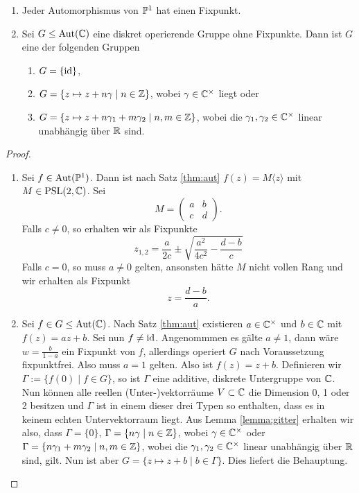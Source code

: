 \begin{lemma}
  \label{lemma:deck-pc}
  \begin{enumerate}
  \item Jeder Automorphismus von $\P^1$ hat einen Fixpunkt.
  \item Sei $G \leq \Aut(\C)$ eine diskret operierende Gruppe ohne
    Fixpunkte. Dann ist $G$ eine der folgenden Gruppen
    \begin{enumerate}
    \item $G = \{\id\}$,
    \item $G = \{ z \mapsto z + n \gamma \mid n \in \Z\}$, wobei $\gamma
      \in \C^\times$ liegt oder
    \item $G = \{z \mapsto z + n \gamma_1 + m \gamma_2 \mid n,m \in
      \Z\}$, wobei die $\gamma_1, \gamma_2 \in \C^\times$ linear
      unabhängig über $\R$ sind.
    \end{enumerate}
  \end{enumerate}
\end{lemma}

\begin{proof}
  \begin{enumerate}
  \item Sei $f \in \Aut(\P^1)$. Dann ist nach Satz \ref{thm:aut} $f(z) = M\langle z \rangle$ mit $M
    \in \PSL(2, \C)$. Sei
    \[
    M =
    \begin{pmatrix}
      a & b \\
      c & d
    \end{pmatrix}.
    \]
    Falls $c \neq 0$, so erhalten wir als Fixpunkte
    \[
    z_{1,2} = \frac{a}{2c} \pm \sqrt{\frac{a^2}{4 c^2} - \frac{d-b}{c}}
    \]
    Falls $c = 0$, so muss $a \neq 0$ gelten, ansonsten hätte $M$ nicht
    vollen Rang und wir erhalten als Fixpunkt
    \[
    z = \frac{d-b}{a}.
    \]
  \item Sei $f \in G \leq \Aut(\C)$. Nach Satz \ref{thm:aut}
    existieren $a \in \C^\times$ und $b \in \C$ mit $f(z) = az
    +b$. Sei nun $f \neq \id$. Angenommmen es gälte $a \neq 1$, dann
    wäre $w = \frac{b}{1-a}$ ein Fixpunkt von $f$, allerdings operiert
    $G$ nach Voraussetzung fixpunktfrei. Also muss $a = 1$
    gelten. Also ist $f(z) = z + b$. Definieren wir $\Gamma := \{f(0) \mid
    f \in G\}$, so ist $\Gamma$ eine additive, diskrete Untergruppe
    von $\C$. Nun können alle reellen (Unter-)vektorräume $V \subset
    \C$ die Dimension 0, 1 oder 2 besitzen und $\Gamma$ ist in einem
    dieser drei Typen so enthalten, dass es in keinem echten
    Untervektorraum liegt. Aus Lemma \ref{lemma:gitter} erhalten wir
    also, dass $\Gamma = \{0\}$, $\Gamma = \{ n \gamma \mid n \in \Z\}$,
    wobei $\gamma \in \C^\times$ oder $\Gamma = \{n \gamma_1 + m
    \gamma_2 \mid n,m \in \Z \}$, wobei die $\gamma_1, \gamma_2 \in
    \C^\times$ linear unabhängig über $\R$ sind, gilt. Nun ist aber $G
    = \{z \mapsto z + b \mid b \in \Gamma \}$. Dies liefert die Behauptung.
  \end{enumerate}
\end{proof}

